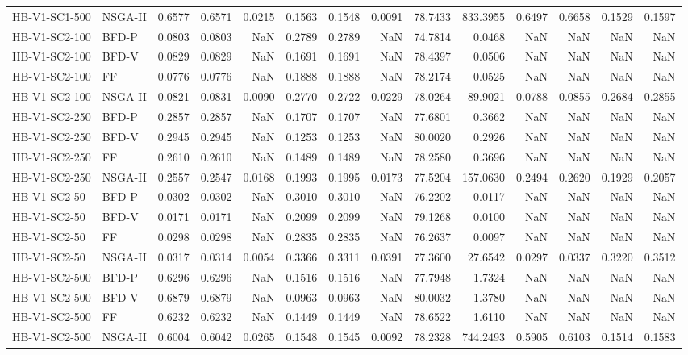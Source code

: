 \begin{tabular}{llrrrrrrrrrrrr}
HB-V1-SC1-500 & NSGA-II & 0.6577 & 0.6571 & 0.0215 & 0.1563 & 0.1548 & 0.0091 & 78.7433 & 833.3955 & 0.6497 & 0.6658 & 0.1529 & 0.1597 \\
HB-V1-SC2-100 & BFD-P & 0.0803 & 0.0803 & NaN & 0.2789 & 0.2789 & NaN & 74.7814 & 0.0468 & NaN & NaN & NaN & NaN \\
HB-V1-SC2-100 & BFD-V & 0.0829 & 0.0829 & NaN & 0.1691 & 0.1691 & NaN & 78.4397 & 0.0506 & NaN & NaN & NaN & NaN \\
HB-V1-SC2-100 & FF & 0.0776 & 0.0776 & NaN & 0.1888 & 0.1888 & NaN & 78.2174 & 0.0525 & NaN & NaN & NaN & NaN \\
HB-V1-SC2-100 & NSGA-II & 0.0821 & 0.0831 & 0.0090 & 0.2770 & 0.2722 & 0.0229 & 78.0264 & 89.9021 & 0.0788 & 0.0855 & 0.2684 & 0.2855 \\
HB-V1-SC2-250 & BFD-P & 0.2857 & 0.2857 & NaN & 0.1707 & 0.1707 & NaN & 77.6801 & 0.3662 & NaN & NaN & NaN & NaN \\
HB-V1-SC2-250 & BFD-V & 0.2945 & 0.2945 & NaN & 0.1253 & 0.1253 & NaN & 80.0020 & 0.2926 & NaN & NaN & NaN & NaN \\
HB-V1-SC2-250 & FF & 0.2610 & 0.2610 & NaN & 0.1489 & 0.1489 & NaN & 78.2580 & 0.3696 & NaN & NaN & NaN & NaN \\
HB-V1-SC2-250 & NSGA-II & 0.2557 & 0.2547 & 0.0168 & 0.1993 & 0.1995 & 0.0173 & 77.5204 & 157.0630 & 0.2494 & 0.2620 & 0.1929 & 0.2057 \\
HB-V1-SC2-50 & BFD-P & 0.0302 & 0.0302 & NaN & 0.3010 & 0.3010 & NaN & 76.2202 & 0.0117 & NaN & NaN & NaN & NaN \\
HB-V1-SC2-50 & BFD-V & 0.0171 & 0.0171 & NaN & 0.2099 & 0.2099 & NaN & 79.1268 & 0.0100 & NaN & NaN & NaN & NaN \\
HB-V1-SC2-50 & FF & 0.0298 & 0.0298 & NaN & 0.2835 & 0.2835 & NaN & 76.2637 & 0.0097 & NaN & NaN & NaN & NaN \\
HB-V1-SC2-50 & NSGA-II & 0.0317 & 0.0314 & 0.0054 & 0.3366 & 0.3311 & 0.0391 & 77.3600 & 27.6542 & 0.0297 & 0.0337 & 0.3220 & 0.3512 \\
HB-V1-SC2-500 & BFD-P & 0.6296 & 0.6296 & NaN & 0.1516 & 0.1516 & NaN & 77.7948 & 1.7324 & NaN & NaN & NaN & NaN \\
HB-V1-SC2-500 & BFD-V & 0.6879 & 0.6879 & NaN & 0.0963 & 0.0963 & NaN & 80.0032 & 1.3780 & NaN & NaN & NaN & NaN \\
HB-V1-SC2-500 & FF & 0.6232 & 0.6232 & NaN & 0.1449 & 0.1449 & NaN & 78.6522 & 1.6110 & NaN & NaN & NaN & NaN \\
HB-V1-SC2-500 & NSGA-II & 0.6004 & 0.6042 & 0.0265 & 0.1548 & 0.1545 & 0.0092 & 78.2328 & 744.2493 & 0.5905 & 0.6103 & 0.1514 & 0.1583 \\

\end{tabular}

